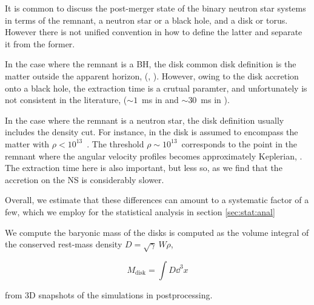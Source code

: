 It is common to discuss the post-merger state of the binary neutron star systems in terms of the remnant, a neutron star or a black hole, and a disk or torus. However there is not unified convention in how to define the latter and separate it from the former. 

In the case where the remnant is a BH, the disk common disk definition is the matter outside the apparent horizon, (\eg, \cite{Dietrich:2015iva,Dietrich:2016hky}). 
However, owing to the disk accretion onto a black hole, the extraction time is a crutual paramter, and unfortunately is not consistent in the literature, (\eg $\sim1$~ms in \cite{Dietrich:2015iva,Dietrich:2016hky} and $\sim30$~ms in \cite{Sekiguchi:2016bjd}).

In the case where the remnant is a neutron star, the disk definition usually includes the density cut. For instance, in \cite{Radice:2018pdn,Kiuchi:2019lls,Vincent:2019kor} the disk is assumed to encompass the matter with $\rho < 10^{13}$~\gcm. 
The threshold $\rho\sim 10^{13}$~\gcm corresponds to the point in the remnant where
the angular velocity profiles becomes approximately Keplerian, \citep[\eg][]{Shibata:2005ss,Shibata:2006nm,Hanauske:2016gia,Kastaun:2016elu}.
The extraction time here is also important, but less so, as we find that the accretion on the NS is considerably slower.

Overall, we estimate that these differences can amount to a systematic factor of a few,
which we employ for the statistical analysis in section \ref{sec:stat:anal}


We compute the baryonic mass of the disks is computed as the volume integral of the conserved rest-mass density $D=\sqrt{\gamma}~W\rho$,

\begin{equation}
\label{eq:method:mdisk}
M_{\text{disk}} = \int D \dd^3 x
\end{equation}

from 3D snapshots of the simulations in postprocessing.






